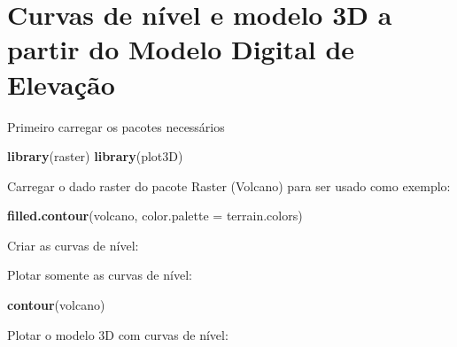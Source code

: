 \documentclass[
]{book}
\newenvironment{Shaded}{\begin{snugshade}}{\end{snugshade}}
\newcommand{\ControlFlowTok}[1]{\textcolor[rgb]{0.13,0.29,0.53}{\textbf{#1}}}
\newcommand{\DataTypeTok}[1]{\textcolor[rgb]{0.13,0.29,0.53}{#1}}
\newcommand{\KeywordTok}[1]{\textcolor[rgb]{0.13,0.29,0.53}{\textbf{#1}}}
\newcommand{\NormalTok}[1]{#1}
\newcommand{\OperatorTok}[1]{\textcolor[rgb]{0.81,0.36,0.00}{\textbf{#1}}}
\newcommand{\StringTok}[1]{\textcolor[rgb]{0.31,0.60,0.02}{#1}}
\begin{document}
\hypertarget{curvas-de-nuxedvel-e-modelo-3d-a-partir-do-modelo-digital-de-elevauxe7uxe3o}{%
\section{Curvas de nível e modelo 3D a partir do Modelo Digital de Elevação}\label{curvas-de-nuxedvel-e-modelo-3d-a-partir-do-modelo-digital-de-elevauxe7uxe3o}}

Primeiro carregar os pacotes necessários

\begin{Shaded}
\begin{Highlighting}[]
\KeywordTok{library}\NormalTok{(raster)}
\KeywordTok{library}\NormalTok{(plot3D)}
\end{Highlighting}
\end{Shaded}

Carregar o dado raster do pacote Raster (Volcano) para ser usado como exemplo:

\begin{Shaded}
\begin{Highlighting}[]
\KeywordTok{filled.contour}\NormalTok{(volcano, }\DataTypeTok{color.palette =}\NormalTok{ terrain.colors)}
\end{Highlighting}
\end{Shaded}

Criar as curvas de nível:

\begin{Shaded}
\end{Shaded}

Plotar somente as curvas de nível:

\begin{Shaded}
\begin{Highlighting}[]
\KeywordTok{contour}\NormalTok{(volcano)}
\end{Highlighting}
\end{Shaded}

Plotar o modelo 3D com curvas de nível:
\end{document}
